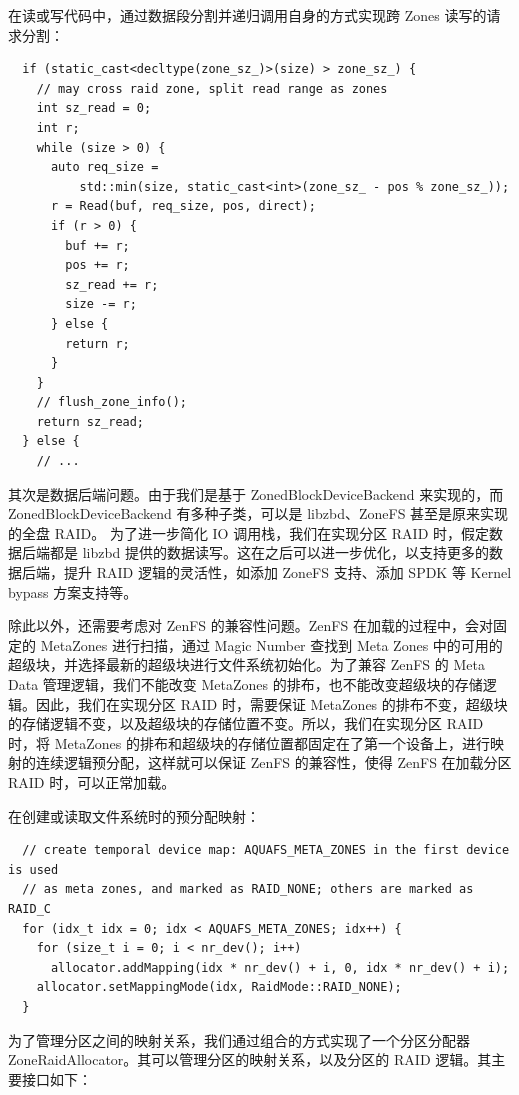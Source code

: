 在读或写代码中，通过数据段分割并递归调用自身的方式实现跨 Zones 读写的请求分割：

\begin{lstlisting}
  if (static_cast<decltype(zone_sz_)>(size) > zone_sz_) {
    // may cross raid zone, split read range as zones
    int sz_read = 0;
    int r;
    while (size > 0) {
      auto req_size =
          std::min(size, static_cast<int>(zone_sz_ - pos % zone_sz_));
      r = Read(buf, req_size, pos, direct);
      if (r > 0) {
        buf += r;
        pos += r;
        sz_read += r;
        size -= r;
      } else {
        return r;
      }
    }
    // flush_zone_info();
    return sz_read;
  } else {
    // ...
\end{lstlisting}

其次是数据后端问题。由于我们是基于 ZonedBlockDeviceBackend 来实现的，而 ZonedBlockDeviceBackend 有多种子类，可以是 libzbd、ZoneFS 甚至是原来实现的全盘 RAID。
为了进一步简化 IO 调用栈，我们在实现分区 RAID 时，假定数据后端都是 libzbd 提供的数据读写。这在之后可以进一步优化，以支持更多的数据后端，提升 RAID 逻辑的灵活性，如添加 ZoneFS 支持、添加 SPDK 等 Kernel bypass 方案支持等。

除此以外，还需要考虑对 ZenFS 的兼容性问题。ZenFS 在加载的过程中，会对固定的 MetaZones 进行扫描，通过 Magic Number 查找到 Meta Zones 中的可用的超级块，并选择最新的超级块进行文件系统初始化。为了兼容 ZenFS 的 Meta Data 管理逻辑，我们不能改变 MetaZones 的排布，也不能改变超级块的存储逻辑。因此，我们在实现分区 RAID 时，需要保证 MetaZones 的排布不变，超级块的存储逻辑不变，以及超级块的存储位置不变。所以，我们在实现分区 RAID 时，将 MetaZones 的排布和超级块的存储位置都固定在了第一个设备上，进行映射的连续逻辑预分配，这样就可以保证 ZenFS 的兼容性，使得 ZenFS 在加载分区 RAID 时，可以正常加载。

在创建或读取文件系统时的预分配映射：

\begin{lstlisting}
  // create temporal device map: AQUAFS_META_ZONES in the first device is used
  // as meta zones, and marked as RAID_NONE; others are marked as RAID_C
  for (idx_t idx = 0; idx < AQUAFS_META_ZONES; idx++) {
    for (size_t i = 0; i < nr_dev(); i++)
      allocator.addMapping(idx * nr_dev() + i, 0, idx * nr_dev() + i);
    allocator.setMappingMode(idx, RaidMode::RAID_NONE);
  }
\end{lstlisting}

为了管理分区之间的映射关系，我们通过组合的方式实现了一个分区分配器 ZoneRaidAllocator。其可以管理分区的映射关系，以及分区的 RAID 逻辑。其主要接口如下：

